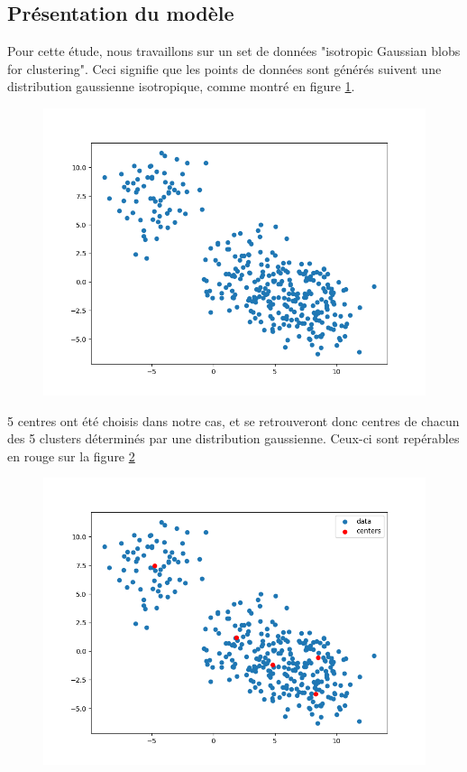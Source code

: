 \documentclass[french,a4paper,18pt]{article}
\begin{document}
\subsection{Présentation du modèle}
Pour cette étude, nous travaillons sur un set de données "isotropic Gaussian blobs for clustering". Ceci signifie que les points de données sont générés suivent une distribution gaussienne isotropique, comme montré en figure \ref{fig:gmm_generate_data}.

\begin{figure}[h!]
    \centering
    \includegraphics[scale=0.4]{../images/gmm_generate_data.png}
    \caption{}\label{fig:gmm_generate_data}
\end{figure}

5 centres ont été choisis dans notre cas, et se retrouveront donc centres de chacun des 5 clusters déterminés par une distribution gaussienne. Ceux-ci sont repérables en rouge sur la figure \ref{fig:gmm_centers}

\begin{figure}[h!]
    \centering
    \includegraphics[scale=0.4]{../images/gmm_centers.png}
    \caption{}\label{fig:gmm_centers}
\end{figure}
\end{document}
